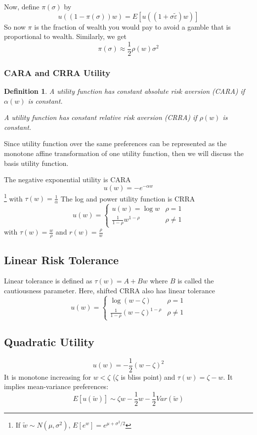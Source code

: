 \documentclass[11pt, a4paper, oneside]{article}
\newtheorem{mydef}{Definition}
\theoremstyle{definition}
\theoremstyle{proposition}
\theoremstyle{corollary}
\theoremstyle{lemma}
\theoremstyle{theorem}
\begin{document}
Now, define $\pi(\sigma)$ by 
$$u((1 - \pi(\sigma))w) = E[u((1+\sigma\tilde{\varepsilon})w)]$$
So now $\pi$ is the fraction of wealth you would pay to avoid a gamble that is proportional to wealth. Similarly, we get
$$\pi(\sigma) \approx \frac{1}{2}\rho(w)\sigma^2$$ 

\subsubsection{CARA and CRRA Utility}
\begin{mydef}
A utility function has constant absolute risk aversion (CARA) if $\alpha(w)$ is constant. 

A utility function has constant relative risk aversion (CRRA) if $\rho(w)$ is constant. 
\end{mydef}

Since utility function over the same preferences can be represented as the monotone affine transformation of one utility function, then we will discuss the basis utility function. 

The negative exponential utility is CARA
$$u(w) = -e^{-\alpha w}$$\footnote{If $\tilde{w} \sim N(\mu, \sigma^2)$, $E[e^{w}] = e^{\mu+\sigma^2/2}$} 
with $\tau(w) =\frac{1}{\alpha}$
The log and power utility function is CRRA
$$u(w) = \begin{cases}
u(w) = \log{w} & \rho = 1\\
\frac{1}{1-\rho}w^{1-\rho} & \rho \neq 1 
\end{cases}$$
with $\tau(w) = \frac{w}{\rho}$ and $r(w) = \frac{\rho}{w}$

\subsection{Linear Risk Tolerance}
Linear tolerance is defined as $\tau(w) = A+Bw$ where $B$ is called the cautiousness parameter. Here, shifted CRRA also has linear tolerance
$$u(w) = \begin{cases}
\log{(w-\zeta)} & \rho = 1\\
\frac{1}{1-\rho} (w-\zeta)^{1-\rho} & \rho \neq 1
\end{cases}$$

\subsection{Quadratic Utility}
$$u(w) = -\frac{1}{2}(w - \zeta)^2$$
It is monotone increasing for $w <\zeta$ ($\zeta$ is bliss point) and $\tau(w) = \zeta - w$. It implies mean-variance preferences:
$$E[u(\tilde{w})]  \sim \zeta w  - \frac{1}{2}w-\frac{1}{2}Var(\tilde{w})$$
\end{document}
